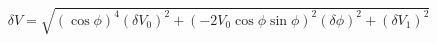\begin{equation}
\label{eq:delta_V_Malus}
\delta V = \sqrt{ \left(\cos{\phi}\right)^4(\delta V_0)^2 + \left(-2V_0 \cos{\phi}\sin{\phi} \right)^2(\delta \phi)^2+ (\delta V_1)^2}
\end{equation}